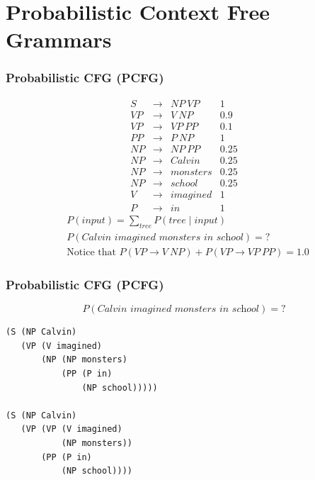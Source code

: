 \section{Probabilistic Context Free Grammars}

\begin{frame}[fragile]
\frametitle{Probabilistic CFG (PCFG)}
\[
\begin{array}{cccc}
 S & \rightarrow & NP~VP  & 1 \\
 VP & \rightarrow & V~NP  & 0.9 \\
 VP & \rightarrow & VP~PP & 0.1 \\
 PP & \rightarrow & P~NP  & 1 \\
 NP & \rightarrow & NP~PP & 0.25 \\
 NP & \rightarrow & Calvin  & 0.25 \\
 NP & \rightarrow & monsters & 0.25 \\
 NP & \rightarrow & school & 0.25 \\
 V & \rightarrow & imagined  &  1 \\
 P & \rightarrow & in     & 1
\end{array}
\]
\begin{eqnarray}
&P(\textit{input}) = \sum_{\textit{tree}} P(\textit{tree} \mid \textit{input}) \nonumber\\
&P(\textit{Calvin imagined monsters in school}) = ? \nonumber\\
&\textrm{Notice that } P(VP \rightarrow V~NP) + P(VP \rightarrow VP~PP) = 1.0 \nonumber
\end{eqnarray}
\end{frame}

\begin{frame}[fragile]
\frametitle{Probabilistic CFG (PCFG)}
\[ P(\textit{Calvin imagined monsters in school}) = ? \]
\begin{verbatim}
(S (NP Calvin)
   (VP (V imagined)
       (NP (NP monsters)
           (PP (P in)
               (NP school)))))

(S (NP Calvin)
   (VP (VP (V imagined)
           (NP monsters))
       (PP (P in)
           (NP school))))
\end{verbatim}

\end{frame}

